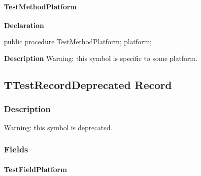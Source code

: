 \documentclass{report}
\begin{document}
\paragraph*{TestMethodPlatform}\hspace*{\fill}

\begin{list}{}{
\setlength{\itemindent}{0cm}
\setlength{\listparindent}{0cm}
\setlength{\leftmargin}{\evensidemargin}
\addtolength{\leftmargin}{\tmplength}
\settowidth{\labelsep}{X}
\addtolength{\leftmargin}{\labelsep}
\setlength{\labelwidth}{\tmplength}
}
\begin{flushleft}
\item[\textbf{Declaration}\hfill]
\begin{ttfamily}
public procedure TestMethodPlatform; platform;\end{ttfamily}


\end{flushleft}
\par
\item[\textbf{Description}]
Warning: this symbol is specific to some platform.

 

\end{list}
\subsection*{TTestRecordDeprecated Record}
\subsubsection*{\large{\textbf{Description}}\normalsize\hspace{1ex}\hfill}
Warning: this symbol is deprecated.

 \subsubsection*{\large{\textbf{Fields}}\normalsize\hspace{1ex}\hfill}
\paragraph*{TestFieldPlatform}\hspace*{\fill}
\end{document}
